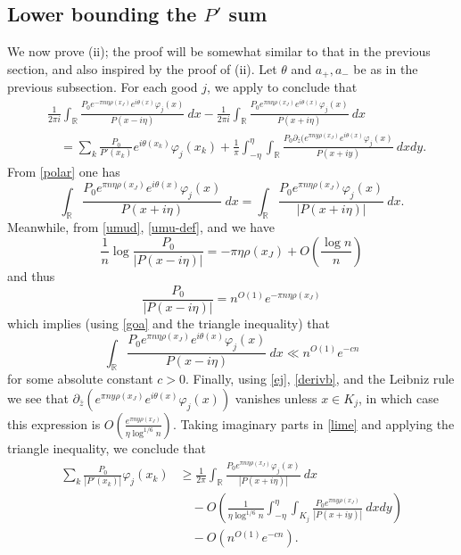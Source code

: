 \documentclass[12pt]{amsart}
\newcommand{\R}{\mathbb{R}}
\begin{document}
\subsection{Lower bounding the \texorpdfstring{$P'$}{P'} sum}

We now prove (ii); the proof will be somewhat similar to that in the previous section, and also inspired by the proof of (ii).  Let $\theta$ and $a_+, a_-$ be as in the previous subsection.  For each good $j$, we apply  to conclude that
\begin{equation}\label{lime}
\begin{split}
&    \frac{1}{2\pi i} \int_\R \frac{P_0 e^{-\pi n \eta \rho(x_J)} e^{i\theta(x)} \varphi_j(x)}{P(x-i\eta)}\ dx - \frac{1}{2\pi i} \int_\R \frac{P_0 e^{\pi n \eta \rho(x_J)} e^{i\theta(x)} \varphi_j(x)}{P(x+i\eta)}\ dx\\
& \quad = \sum_k \frac{P_0}{P'(x_k)} e^{i\theta(x_k)} \varphi_j(x_k) + \frac{1}{\pi} \int_{-\eta}^{\eta} \int_\R \frac{P_0 \partial_{\bar z} (e^{\pi n y \rho(x_J)} e^{i \theta(x)} \varphi_j(x)}{P(x+iy)}\ dx dy.
\end{split}
\end{equation}
From \eqref{polar} one has
$$ \int_\R \frac{P_0 e^{\pi n \eta \rho(x_J)} e^{i\theta(x)} \varphi_j(x)}{P(x+i\eta)}\ dx = \int_\R \frac{P_0 e^{\pi n \eta \rho(x_J)} \varphi_j(x)}{|P(x+i\eta)|}\ dx.$$
Meanwhile, from \eqref{umud}, \eqref{umu-def}, and  we have
$$ \frac{1}{n} \log \frac{P_0}{|P(x-i\eta)|} = - \pi \eta \rho(x_J) + O\left( \frac{\log n}{n} \right)$$
and thus
$$ \frac{P_0}{|P(x-i\eta)|} = n^{O(1)} e^{-\pi n \eta \rho(x_J)}$$
which implies (using \eqref{goa} and the triangle inequality) that
$$ \int_\R \frac{P_0 e^{\pi n \eta \rho(x_J)} e^{i\theta(x)} \varphi_j(x)}{P(x-i\eta)}\ dx \ll n^{O(1)} e^{-cn} $$
for some absolute constant $c>0$.  Finally, using \eqref{ej}, \eqref{derivb}, and the Leibniz rule we see that $\partial_{\bar z}( e^{\pi n y \rho(x_J)} e^{i\theta(x)} \varphi_j(x) )$ vanishes unless $x \in K_j$, in which case this expression is $O( \frac{e^{\pi n y \rho(x_J)}}{\eta \log^{1/6} n} )$. Taking imaginary parts in \eqref{lime} and applying the triangle inequality, we conclude that
\begin{align*}
\sum_k \frac{P_0}{|P'(x_k)|} \varphi_j(x_k) &\geq \frac{1}{2\pi} \int_\R \frac{P_0 e^{\pi n \eta \rho(x_J)} \varphi_j(x)}{|P(x+i\eta)|}\ dx\\
&\quad - O\left( \frac{1}{\eta \log^{1/6} n} \int_{-\eta}^{\eta} \int_{K_j} \frac{P_0 e^{\pi n y \rho(x_J)}}{|P(x+iy)|}\ dx dy \right) \\
&\quad - O(n^{O(1)} e^{-cn}  ).
\end{align*}
\end{document}
